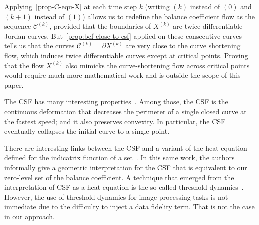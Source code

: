 \documentclass{siamart220329}
\newcommand{\C}{\mathcal{C}} %
\begin{document}
Applying~\cref{prop-C-equ-X} at each time step $k$ (writing
$(k)$ instead of $(0)$ and $(k+1)$ instead of $(1)$) allows us to
redefine the balance coefficient flow as the sequence $\C^{(k)}$,
provided that the boundaries of $X^{(k)}$ are twice differentiable
Jordan curves. But~\cref{prop:bcf-close-to-csf} applied on
these consecutive curves tells us that the curves $\C^{(k)}=\partial
X^{(k)}$ are very close to the curve shortening flow, which induces
twice differentiable curves except at critical points. Proving that
the flow $X^{(k)}$ also mimicks the curve-shortening flow across
critical points would require much more mathematical work and is
outside the scope of this paper.

The CSF has many interesting
properties~\cite{huisken84flow,gage86heat,ecker2008heat}. Among those, the CSF
is the continuous deformation that decreases the perimeter of a single closed
curve at the fastest speed; and it also preserves convexity. In particular, the
CSF eventually collapses the initial curve to a single point.

There are interesting links between the CSF and a variant of the heat equation
defined for the indicatrix function of a set~\cite{merriman1992diffusion}. In
this same work, the authors informally give a geometric interpretation for the
CSF that is equivalent to our zero-level set of the balance coefficient. A
technique that emerged from the interpretation of CSF as a heat equation is the
so called threshold dynamics~\cite{esedoglu2005threshold,esedoglu2008threshold}.
However, the use of threshold dynamics for image processing tasks is not
immediate due to the difficulty to inject a data fidelity term. That is not the
case in our approach.
\end{document}
